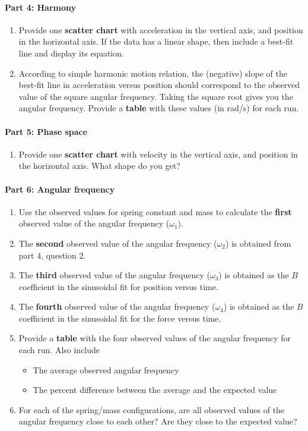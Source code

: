 \paragraph{Part 4: Harmony}
%
\begin{enumerate}
    \item Provide one \textbf{scatter chart} with acceleration in the vertical axis, and position in the horizontal axis. If the data has a linear shape, then include a best-fit line and display its equation.
    \item According to simple harmonic motion relation, the (negative) slope of the best-fit line in acceleration versus position should correspond to the observed value of the square angular frequency. Taking the square root gives you the angular frequency. Provide a \textbf{table} with these values (in rad/s) for each run.
\end{enumerate}
%
\paragraph{Part 5: Phase space}
%
\begin{enumerate}
    \item Provide one \textbf{scatter chart} with velocity in the vertical axis, and position in the horizontal axis. What shape do you get?
\end{enumerate}
%
\paragraph{Part 6: Angular frequency}
%
\begin{enumerate}
    \item Use the observed values for spring constant and mass to calculate the \textbf{first} observed value of the angular frequency ($\omega_{1}$).
    \item The \textbf{second} observed value of the angular frequency ($\omega_{2}$) is obtained from part 4, question 2.
    \item The \textbf{third} observed value of the angular frequency ($\omega_{3}$) is obtained as the $B$ coefficient in the sinusoidal fit for position versus time.
    \item The \textbf{fourth} observed value of the angular frequency ($\omega_{4}$) is obtained as the $B$ coefficient in the sinusoidal fit for the force versus time.
    \item Provide a \textbf{table} with the four observed values of the angular frequency for each run. Also include
    \begin{itemize}
        \item The average observed angular frequency
        \item The percent difference between the average and the expected value
    \end{itemize}
    \item For each of the spring/mass configurations, are all observed values of the angular frequency close to each other? Are they close to the expected value?
\end{enumerate}
%
\newpage
